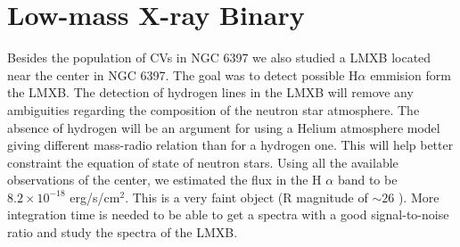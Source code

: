 \section{Low-mass X-ray Binary}


Besides the population of CVs in NGC 6397 we also studied a LMXB located near the center in NGC 6397. The goal was to detect possible H$\alpha$ emmision form the LMXB. The detection of hydrogen lines in the LMXB  will remove any ambiguities regarding the composition of the neutron star atmosphere. The absence of hydrogen  will be an argument for using a Helium atmosphere model giving different mass-radio relation than for a hydrogen one. This will help better constraint the equation of state of neutron stars. Using all the available observations of the center, we estimated the flux in the H $\alpha$ band to be $8.2 \times 10^{-18}$ erg/s/cm$^2$. This is a very faint object (R magnitude of $\sim 26$ \citep{heinke_improved_2014}). More integration time is needed to be able to get a spectra with a good signal-to-noise ratio and study the spectra of the LMXB. 


